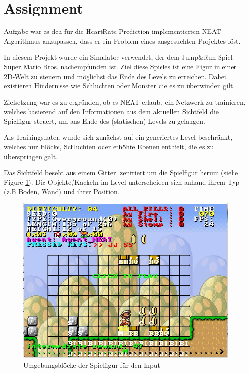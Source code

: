 \documentclass{hbrs-ecta-report}
\begin{document}
\FloatBarrier
\newpage
\newpage
\section{Assignment}
Aufgabe war es den für die HeartRate Prediction implementierten NEAT Algorithmus\cite{Stanley2002a} anzupassen, dass er ein Problem eines ausgesuchten Projektes löst.

In diesem Projekt wurde ein Simulator verwendet, der dem Jump\&Run Spiel Super Mario Bros. nachempfunden ist.
Ziel diese Spieles ist eine Figur in einer 2D-Welt zu steuern und möglichst das Ende des Levels zu erreichen. Dabei existieren Hindernisse wie Schluchten oder Monster die es zu überwinden gilt. 

Zielsetzung war es zu ergründen, ob es NEAT erlaubt ein Netzwerk zu trainieren, welches basierend auf den Informationen aus dem aktuellen Sichtfeld die Spielfigur steuert, um ans Ende des (statischen) Levels zu gelangen.

Als Trainingsdaten wurde sich zunächst auf ein generiertes Level beschränkt, welches nur Blöcke, Schluchten oder erhöhte Ebenen enthielt, die es zu überspringen galt.

Das Sichtfeld beseht aus einem Gitter, zentriert um die Spielfigur herum (siehe Figure \ref{fig:MarioInput}). Die Objekte/Kacheln im Level unterscheiden sich anhand ihrem Typ (z.B Boden, Wand) und ihrer Position.

\begin{figure}[h!]
	\centering
	\includegraphics[width=\linewidth]{img/MarioInput.jpg}
	\caption{Umgebungsblöcke der Spielfigur für den Input}
	\label{fig:MarioInput} 
\end{figure}
\end{document}

